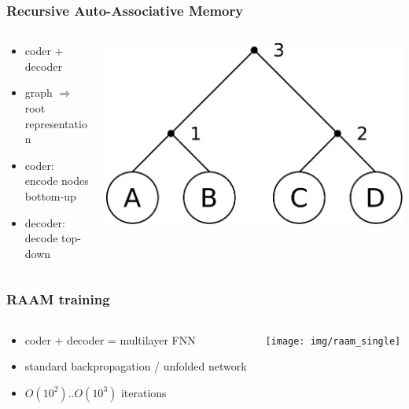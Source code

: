 \documentclass{beamer}
\begin{document}
\begin{frame}
\frametitle{Recursive Auto-Associative Memory}
\begin{columns}
	\begin{column}{0.6\textwidth}
		\begin{itemize}
			\item coder + decoder
			\item graph $\Rightarrow$ root representation
			\item coder: encode nodes bottom-up
			\item decoder: decode top-down
		\end{itemize}
	\end{column}
	\begin{column}{0.4\textwidth}
		\includegraphics[scale=0.35]{img/tree_for_raam}
	\end{column}
\end{columns}
\end{frame}

\begin{frame}
\frametitle{RAAM training}
\begin{columns}
	\begin{column}{0.66\textwidth}
		\begin{itemize}
			\item coder + decoder = multilayer FNN
			\item standard backpropagation / unfolded network
			\item $O(10^2)..O(10^3)$ iterations
		\end{itemize}
	\end{column}
	\begin{column}{0.34\textwidth}
		\texttt{[image: img/raam\_single]}
	\end{column}
\end{columns}
\end{frame}
\end{document}
